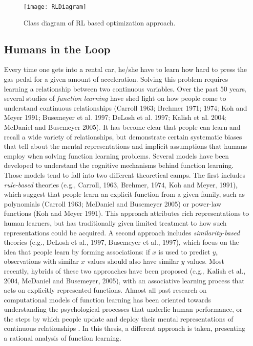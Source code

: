 \begin{figure} [h!]
	\texttt{[image: RLDiagram]}
	\caption{Class diagram of RL based optimization approach.}
	\label{fig:RLUMLDiagram}
\end{figure}

\subsection{Humans in the Loop} Every time one gets into a rental car, he/she have to learn how hard to press the gas pedal for a given amount of acceleration. Solving this problem requires learning a relationship between two continuous variables. Over the past 50 years, several studies of \textit{function learning} have shed light on how people come to understand continuous relationships (Carroll 1963; Brehmer 1971; 1974; Koh and Meyer 1991; Busemeyer et al. 1997; DeLosh et al. 1997; Kalish et al. 2004; McDaniel and Busemeyer 2005). It has become clear that people can learn and recall a wide variety of relationships, but demonstrate certain systematic biases that tell about the mental representations and implicit assumptions that humans employ when solving function learning problems. Several models have been developed to understand the cognitive mechanisms behind function learning. Those models tend to fall into two different theoretical camps. The first includes \textit{rule-based} theories (e.g., Carroll, 1963, Brehmer, 1974, Koh and Meyer, 1991), which suggest that people learn an explicit function from a given family, such as polynomials (Carroll 1963; McDaniel and Busemeyer 2005) or power-law functions (Koh and Meyer 1991). This approach attributes rich representations to human learners, but has traditionally given limited treatment to how such representations could be acquired. A second approach includes \textit{similarity-based} theories (e.g., DeLosh et al., 1997, Busemeyer et al., 1997), which focus on the idea that people learn by forming associations: if $x$ is used to predict $y$, observations with similar $x$ values should also have similar $y$ values. Most recently, hybrids of these two approaches have been proposed (e.g., Kalish et al., 2004, McDaniel and Busemeyer, 2005), with an associative learning process that acts on explicitly represented functions. Almost all past research on computational models of function learning has been oriented towards understanding the psychological processes that underlie human performance, or the steps by which people update and deploy their mental representations of continuous relationships \cite{Lucas2015}. In this thesis, a different approach is taken, presenting a rational analysis of function learning. \\

